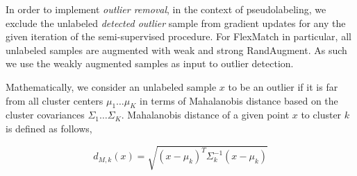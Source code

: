 \documentclass[10pt,twocolumn,letterpaper]{article}
\begin{document}
In order to implement \textit{outlier removal}, in the context of pseudolabeling, we exclude the unlabeled \textit{detected outlier} sample from gradient updates for any the given iteration of the semi-supervised procedure.  For FlexMatch in particular, all unlabeled samples are augmented with weak and strong RandAugment.  As such we use the weakly augmented samples as input to outlier detection.





%
%

Mathematically, we consider an unlabeled sample $x$ to be an outlier if it is far from all cluster centers $\mu_1 \dots \mu_K$ in terms of Mahalanobis distance based on the cluster covariances $\Sigma_1 \dots \Sigma_K$.  Mahalanobis distance of a given point $x$ to cluster $k$ is defined as follows,

\begin{equation}
	d_{M,k}(x) = \sqrt{ \left(x - \mu_k\right)^T \Sigma_k^{-1} \left(x - \mu_k\right)  }
\end{equation}
\end{document}
